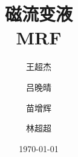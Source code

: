 \documentclass[12pt]{article}
\begin{document}
\title{ 磁流变液\\
	MRF}
\date{\today}
\author{王超杰\and 吕晚晴\and 苗增辉\and 林超超}

\maketitle

\abstract

\thispagestyle{empty}
\newpage
\tableofcontents
\thispagestyle{empty}
\newpage
\setcounter{page}{1}







\end{document}
